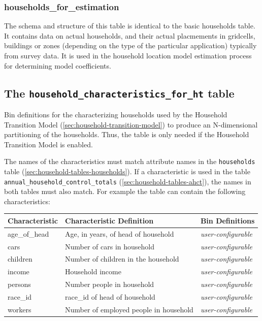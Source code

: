 \subsubsection{households_for_estimation }

The schema and structure of this table is identical to the basic households
table. It contains data on actual households, and their actual placmements in
gridcells, buildings or zones (depending on the type of the particular application) 
typically from survey data. It is used in the household
location model estimation process for determining model
coefficients.

\subsection{The {\tt household_characteristics_for_ht} table}
\label{sec:household-tables-char-for-ht}

Bin definitions for the characterizing households used by the Household
Transition Model (\ref{sec:household-transition-model})
to produce an N-dimensional partitioning of the households. Thus, the table is only needed if the
Household Transition Model \modelsindex is enabled.

The names of the
characteristics must match
attribute names in the {\tt households} table (\ref{sec:household-tables-households}).
If a characteristic is used in the table {\tt annual_household_control_totals}
(\ref{sec:household-tables-ahct}), the names in both tables must also match.
For example the table can contain the following
characteristics:

\begin{tabular}{lp{2in}p{3in}}
\textbf{Characteristic}
&\textbf{Characteristic Definition}
&\textbf{Bin Definitions}
\\
\hline
age_of_head & Age, in years, of head of household  & \emph{user-configurable}
\\
\hline
cars &Number of cars in household & \emph{user-configurable}
\\
\hline
children &Number of children in the household & \emph{user-configurable}
\\
\hline
income &Household income  & \emph{user-configurable}
\\
\hline
persons &Number people in household & \emph{user-configurable}
\\
\hline
race_id &race_id of head of household & \emph{user-configurable}
\\
\hline
workers &Number of employed people in household & \emph{user-configurable}
\\
\hline

\end{tabular}


